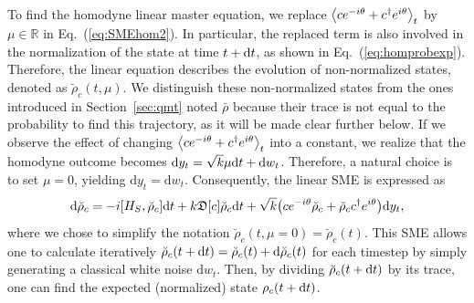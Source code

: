 To find the homodyne linear master equation, we replace $\expval{ce^{-i\theta}+c^\dagger e^{i\theta}}_t$ by $\mu\in\mathbb{R}$ in Eq.~(\ref{eq:SMEhom2}). In particular, the replaced term is also involved in the normalization of the state at time $t+\mathrm{d}t$, as shown in Eq.~(\ref{eq:homprobexp}). Therefore, the linear equation describes the evolution of non-normalized states, denoted as $\breve{\rho}_c(t,\mu)$. We distinguish these non-normalized states from the ones introduced in Section~\ref{sec:qmt} noted $\bar{\rho}$ because their trace is not equal to the probability to find this trajectory, as it will be made clear further below. If we observe the effect of changing $\expval{ce^{-i\theta}+c^\dagger e^{i\theta}}_t$ into a constant, we realize that the homodyne outcome becomes $\mathrm{d}y_t = \sqrt{k}\mu\mathrm{d}t +\mathrm{d}w_t$. Therefore, a natural choice is to set $\mu=0$, yielding $\mathrm{d}y_t=\mathrm{d}w_t$. Consequently, the linear SME is expressed as
\begin{equation}\label{eq:linhom}
    \mathrm{d}\breve{\rho}_c = -i\qty[H_S, \breve{\rho}_c]\mathrm{d}t + k\mathfrak{D}\qty[c]\breve{\rho}_c \mathrm{d}t+ \sqrt{k}\qty(ce^{-i\theta}\breve{\rho}_c+\breve{\rho}_c c^\dagger e^{i\theta})\mathrm{d}y_t,
\end{equation}
where we chose to simplify the notation $\breve{\rho}_c(t,\mu=0)=\breve{\rho}_c(t)$.
This SME allows one to calculate iteratively $\breve{\rho}_c(t+\mathrm{d}t)=\breve{\rho}_c(t)+\mathrm{d}\breve{\rho}_c(t)$ for each timestep by simply generating a classical white noise $\mathrm{d}w_t$. Then, by dividing $\breve{\rho}_c(t+\mathrm{d}t)$ by its trace, one can find the expected (normalized) state $\rho_c(t+\mathrm{d}t)$. 

